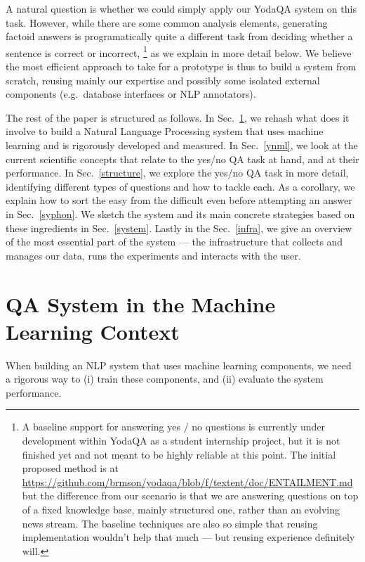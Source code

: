 \documentclass[11pt,a4paper]{article}
\begin{document}
A natural question is whether we could simply apply our YodaQA system
on this task.  However, while there are some common analysis elements,
generating factoid answers is programatically quite a different task
from deciding whether a sentence is correct or incorrect,%
\footnote{A baseline support for answering yes / no questions is currently
under development within YodaQA as a student internship project, but it is
not finished yet and not meant to be highly reliable at this point.
The initial proposed method is at
\url{https://github.com/brmson/yodaqa/blob/f/textent/doc/ENTAILMENT.md}
but the difference from our scenario is that we are answering questions
on top of a fixed knowledge base, mainly structured one, rather than an
evolving news stream.  The baseline techniques are also so simple that
reusing implementation wouldn't help that much --- but reusing experience
definitely will.}
as we explain in more detail below.
We believe the most efficient approach to take for a prototype is thus
to build a system from scratch, reusing mainly our expertise and possibly
some isolated external components (e.g.\ database interfaces or NLP annotators).

The rest of the paper is structured as follows.
In Sec.~\ref{qaml}, we rehash what does it involve to build a Natural Language Processing
system that uses machine learning and is rigorously developed and measured.
In Sec.~\ref{ynml}, we look at the current scientific concepts that relate
to the yes/no QA task at hand, and at their performance.
In Sec.~\ref{structure}, we explore the yes/no QA task in more detail,
identifying different types of questions and how to tackle each.
As a corollary, we explain how to sort the easy from the difficult
even before attempting an answer in Sec.~\ref{syphon}.
We sketch the system and its main concrete strategies based on these
ingredients in Sec.~\ref{system}.
Lastly in the Sec.~\ref{infra}, we give an overview of
the most essential part of the system --- the infrastructure
that collects and manages our data, runs the experiments and interacts with the user.

\section{QA System in the Machine Learning Context}
\label{qaml}

When building an NLP system that uses machine learning components,
we need a rigorous way to (i) train these components, and (ii) evaluate
the system performance.
\end{document}
